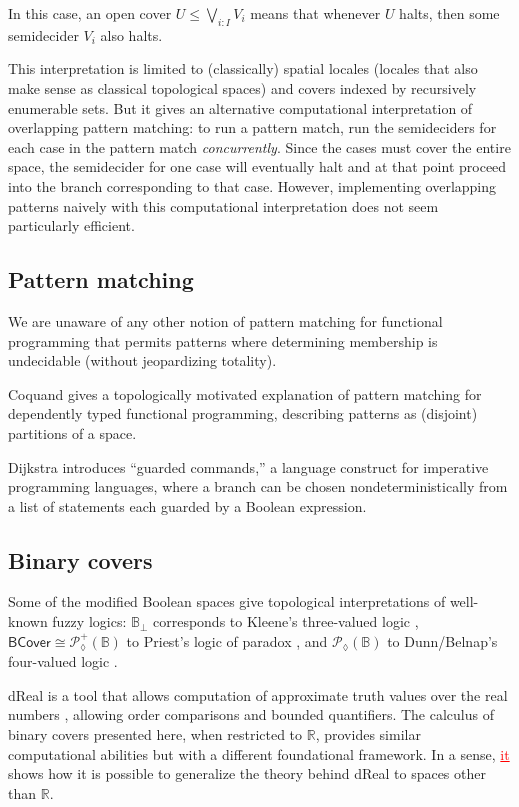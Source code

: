 \documentclass[conference]{IEEEtran}
\newcommand{\PLower}{\mathcal{P}_\lozenge}
\newcommand{\R}{\mathbb{R}}
\newcommand{\bool}{\mathbb{B}}
\newcommand{\BCover}{\mathsf{BCover}}
\newcommand{\grammar}[1]{\textcolor{red}{\underline{#1}}}
\begin{document}
In this case, an open cover $U \le \bigvee_{i : I} V_i$ means that whenever $U$ halts, then some semidecider $V_i$ also halts.

This interpretation is limited to (classically) spatial locales (locales that also make sense as classical topological spaces) and covers indexed by recursively enumerable sets. But it gives an alternative computational interpretation of overlapping pattern matching: to run a pattern match, run the semideciders for each case in the pattern match \emph{concurrently}. Since the cases must cover the entire space, the semidecider for one case will eventually halt and at that point proceed into the branch corresponding to that case. However, implementing overlapping patterns naively with this computational interpretation does not seem particularly efficient.

\subsection{Pattern matching}

We are unaware of any other notion of pattern matching for functional programming that permits patterns where determining membership is undecidable (without jeopardizing totality).

Coquand \cite{coquand1992} gives a topologically motivated explanation of pattern matching for dependently typed functional programming, describing patterns as (disjoint) partitions of a space.

Dijkstra \cite{dijkstra} introduces ``guarded commands,'' a language construct for imperative programming languages, where a branch can be chosen nondeterministically from a list of statements each guarded by a Boolean expression.

\subsection{Binary covers}

Some of the modified Boolean spaces give topological interpretations of well-known fuzzy logics: $\bool_\bot$ corresponds to Kleene's three-valued logic \cite{kleenemetamathematics}, $\BCover \cong \PLower^+(\bool)$ to Priest's logic of paradox \cite{priest}, and $\PLower(\bool)$ to Dunn/Belnap's four-valued logic \cite{sep-logic-manyvalued}.

dReal is a tool that allows computation of approximate truth values over the real numbers \cite{dReal}, allowing order comparisons and bounded quantifiers. The calculus of binary covers presented here, when restricted to $\R$, provides similar computational abilities but with a different foundational framework. In a sense, \grammar{it} shows how it is possible to generalize the theory behind dReal to spaces other than $\R$.
\end{document}
